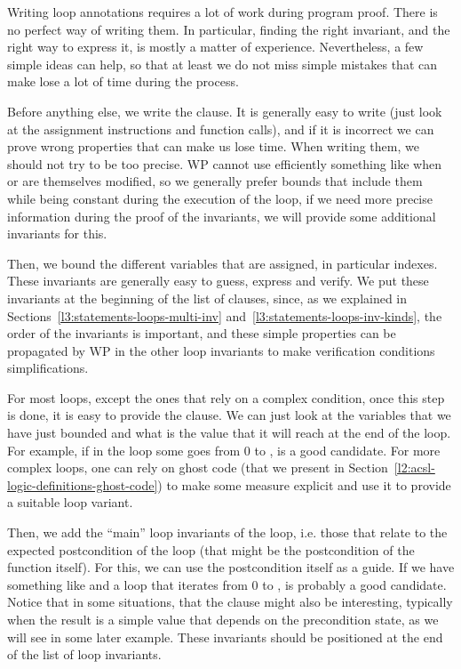 

Writing loop annotations requires a lot of work during program proof. There is
no perfect way of writing them. In particular, finding the right invariant, and
the right way to express it, is mostly a matter of experience. Nevertheless, a
few simple ideas can help, so that at least we do not miss simple mistakes that
can make lose a lot of time during the process.


Before anything else, we write the  clause. It is
generally easy to write (just look at the assignment instructions and function
calls), and if it is incorrect we can prove wrong properties that can make us
lose time. When writing them, we should not try to be too precise. WP cannot use
efficiently something like  when  or
 are themselves modified, so we generally prefer bounds that
include them while being constant during the execution of the loop, if we need
more precise information during the proof of the invariants, we will provide
some additional invariants for this.


Then, we bound the different variables that are assigned, in particular indexes.
These invariants are generally easy to guess, express and verify. We put these
invariants at the beginning of the list of  clauses,
since, as we explained in Sections~\ref{l3:statements-loops-multi-inv}
and~\ref{l3:statements-loops-inv-kinds}, the order of the invariants is important,
and these simple properties can be propagated by WP in the other loop invariants
to make verification conditions simplifications.


For most loops, except the ones that rely on a complex condition, once this step
is done, it is easy to provide the  clause. We can just
look at the variables that we have just bounded and what is the value that it
will reach at the end of the loop. For example, if in the loop some 
goes from 0 to ,  is a good candidate. For more
complex loops, one can rely on ghost code (that we present in
Section~\ref{l2:acsl-logic-definitions-ghost-code}) to make some measure
explicit and use it to provide a suitable loop variant.


Then, we add the ``main'' loop invariants of the loop, i.e. those that relate to
the expected postcondition of the loop (that might be the postcondition of the
function itself). For this, we can use the postcondition itself as a guide. If
we have something like  and a loop that iterates
 from 0 to ,  is
probably a good candidate. Notice that in some situations, that the
 clause might also be interesting, typically when the result
is a simple value that depends on the precondition state, as we will see in some
later example. These invariants should be positioned at the end of the list of
loop invariants.


